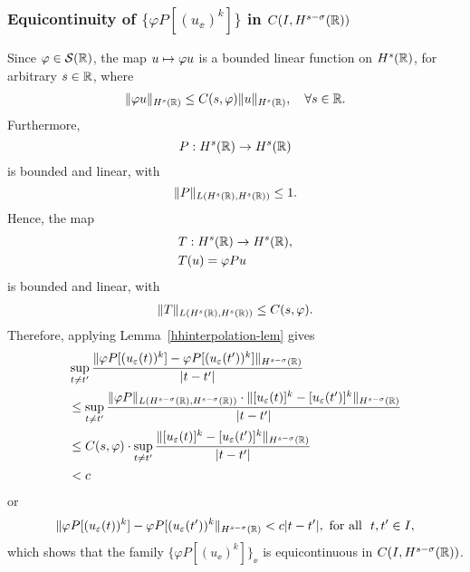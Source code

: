 \subsubsection{Equicontinuity of $\{ \varphi P [(u_\ee)^k]\}$  in $C(I,
H^{s-\sigma}(\mathbb{R}))$}
%
%
Since $\varphi \in \mathcal{S}(\mathbb{R})$, the map $u \mapsto \varphi u$
is a bounded linear function on $H^s(\mathbb{R})$, for arbitrary $s \in
\mathbb{R}$, where  
\begin{equation}
\begin{split}
\|\varphi u\|_{H^s(\mathbb{R})} \le C(s, \varphi)
\|u\|_{H^s(\mathbb{R})}, \quad \forall s\in \mathbb{R}.
\label{hhschwartz-estimate}
\end{split}
\end{equation}
Furthermore, $$P: H^s(\mathbb{R}) \to H^s(\mathbb{R})$$ is bounded and linear,
with 
\begin{equation}
\label{operator-normaa}
\|P\|_{L(H^s(\mathbb{R}), H^s(\mathbb{R}))} \le 1.
\end{equation}
Hence, the map 
\begin{equation}
\label{the-map}
\begin{split}
& T: H^s(\mathbb{R}) \to H^s(\mathbb{R}),
\\
& T(u) = \varphi P u 
\end{split}
\end{equation}
is bounded and linear, with 
\begin{equation}
\begin{split}
\|T\|_{L(H^s(\mathbb{R}), H^s(\mathbb{R}))} \le C(s, \varphi).
\label{op-norm-product}
\end{split}
\end{equation}
Therefore, applying Lemma~\ref{hhinterpolation-lem} gives 
%
\begin{equation*}
\begin{split}
\label{hhequic-1}
& \sup_{t \neq t'} \frac {\| \varphi P [(u_\varepsilon(t))^k] - \varphi
P [(u_\varepsilon(t'))^k] \|_{H^{s -
\sigma  }(\mathbb{R})}}{|t - t'|}
\\
& \le \sup_{t \neq t'}  \frac {\|\varphi P \|_{L(H^{s-\sigma}(\mathbb{R}),
H^{s-\sigma}(\mathbb{R}))} \cdot \|   [u_\varepsilon(t)]^k  - 
[u_\varepsilon(t')]^k \|_{H^{s -
\sigma }(\mathbb{R})}}{|t - t'|}
\\
& \le C(s, \varphi) \cdot \sup_{t \neq t'}  \frac {\|   [u_\varepsilon(t)]^k  - 
[u_\varepsilon(t')]^k \|_{H^{s -
\sigma }(\mathbb{R})}}{|t - t'|}
\\
&< c
\end{split}
\end{equation*}
%
or
%
\begin{equation*}
\label{hhequic-2}
\|\varphi P [(u_\varepsilon(t))^k] - \varphi
P [(u_\varepsilon(t'))^k \|_{H^{s - \sigma }(\mathbb{R})}< c|t -
t'|, 
\ \text{for all} \   \,\,  t, t'\in I,
\end{equation*}
%
which shows that  the family  $\{\varphi P [(u_\ee)^k]\}_\ee$ is
equicontinuous in $C(I, H^{s-\sigma }(\mathbb{R}))$.  
%
%
%
%
%
%
%
%
%
%
%		
